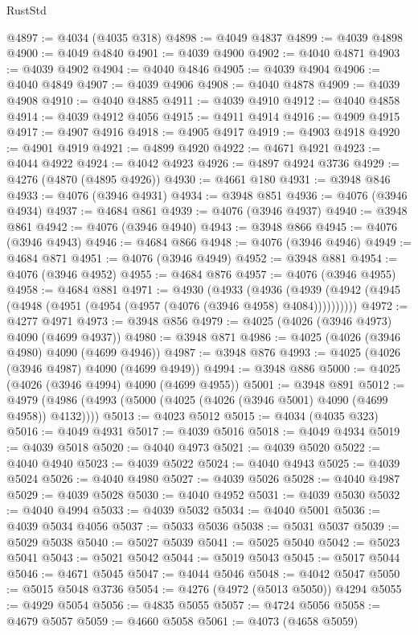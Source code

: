 \begin{lexlean}{RustStd}
\begin{coremodule}
@4897 := @4034 (@4035 @318)
@4898 := @4049 @4837
@4899 := @4039 @4898
@4900 := @4049 @4840
@4901 := @4039 @4900
@4902 := @4040 @4871
@4903 := @4039 @4902
@4904 := @4040 @4846
@4905 := @4039 @4904
@4906 := @4040 @4849
@4907 := @4039 @4906
@4908 := @4040 @4878
@4909 := @4039 @4908
@4910 := @4040 @4885
@4911 := @4039 @4910
@4912 := @4040 @4858
@4914 := @4039 @4912 @4056
@4915 := @4911 @4914
@4916 := @4909 @4915
@4917 := @4907 @4916
@4918 := @4905 @4917
@4919 := @4903 @4918
@4920 := @4901 @4919
@4921 := @4899 @4920
@4922 := @4671 @4921
@4923 := @4044 @4922
@4924 := @4042 @4923
@4926 := @4897 @4924 @3736
@4929 := @4276 (@4870 (@4895 @4926))
@4930 := @4661 @180
@4931 := @3948 @846
@4933 := @4076 (@3946 @4931)
@4934 := @3948 @851
@4936 := @4076 (@3946 @4934)
@4937 := @4684 @861
@4939 := @4076 (@3946 @4937)
@4940 := @3948 @861
@4942 := @4076 (@3946 @4940)
@4943 := @3948 @866
@4945 := @4076 (@3946 @4943)
@4946 := @4684 @866
@4948 := @4076 (@3946 @4946)
@4949 := @4684 @871
@4951 := @4076 (@3946 @4949)
@4952 := @3948 @881
@4954 := @4076 (@3946 @4952)
@4955 := @4684 @876
@4957 := @4076 (@3946 @4955)
@4958 := @4684 @881
@4971 := @4930
    (@4933
      (@4936 (@4939 (@4942 (@4945 (@4948 (@4951 (@4954 (@4957 (@4076 (@3946 @4958) @4084))))))))))
@4972 := @4277 @4971
@4973 := @3948 @856
@4979 := @4025 (@4026 (@3946 @4973) @4090 (@4699 @4937))
@4980 := @3948 @871
@4986 := @4025 (@4026 (@3946 @4980) @4090 (@4699 @4946))
@4987 := @3948 @876
@4993 := @4025 (@4026 (@3946 @4987) @4090 (@4699 @4949))
@4994 := @3948 @886
@5000 := @4025 (@4026 (@3946 @4994) @4090 (@4699 @4955))
@5001 := @3948 @891
@5012 := @4979 (@4986 (@4993 (@5000 (@4025 (@4026 (@3946 @5001) @4090 (@4699 @4958)) @4132))))
@5013 := @4023 @5012
@5015 := @4034 (@4035 @323)
@5016 := @4049 @4931
@5017 := @4039 @5016
@5018 := @4049 @4934
@5019 := @4039 @5018
@5020 := @4040 @4973
@5021 := @4039 @5020
@5022 := @4040 @4940
@5023 := @4039 @5022
@5024 := @4040 @4943
@5025 := @4039 @5024
@5026 := @4040 @4980
@5027 := @4039 @5026
@5028 := @4040 @4987
@5029 := @4039 @5028
@5030 := @4040 @4952
@5031 := @4039 @5030
@5032 := @4040 @4994
@5033 := @4039 @5032
@5034 := @4040 @5001
@5036 := @4039 @5034 @4056
@5037 := @5033 @5036
@5038 := @5031 @5037
@5039 := @5029 @5038
@5040 := @5027 @5039
@5041 := @5025 @5040
@5042 := @5023 @5041
@5043 := @5021 @5042
@5044 := @5019 @5043
@5045 := @5017 @5044
@5046 := @4671 @5045
@5047 := @4044 @5046
@5048 := @4042 @5047
@5050 := @5015 @5048 @3736
@5054 := @4276 (@4972 (@5013 @5050)) @4294
@5055 := @4929 @5054
@5056 := @4835 @5055
@5057 := @4724 @5056
@5058 := @4679 @5057
@5059 := @4660 @5058
@5061 := @4073 (@4658 @5059)

\end{coremodule}
\end{lexlean}
